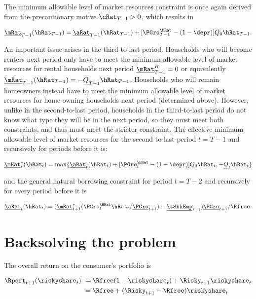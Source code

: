 \documentclass[PortfolioChoiceWithRiskyHousing]{subfiles}
\begin{document}
The minimum allowable level of market resources constraint is once again derived from the precautionary motive $\cRat_{T-1} > 0$, which results in

\begin{equation}
	\underline{\mRat}_{T-1}(\hRat_{T-1}) = \underline{\aRat}_{T-1}( \hRat_{T-1}) + [\PGro^{\HRat}_{T-1} - (1-\depr) ] Q_{0} \hRat_{T-1}.
\end{equation}

An important issue arises in the third-to-last period. Households who will become renters next period only have to meet the minimum allowable level of market resources for rental households next period $\underline{\mRat}^R_{T-1} = 0$ or equivalently $\underline{\mRat}_{T-1}(\hRat_{T-1}) = - \underline{Q}_{T-1} \hRat_{T-1}$. Households who will remain homeowners instead have to meet the minimum allowable level of market resources for home-owning households next period (determined above). However, unlike in the second-to-last period, households in the third-to-last period do not know what type they will be in the next period, so they must meet both constraints, and thus must meet the stricter constraint. The effective minimum allowable level of market resources for the second to-last-period $t=T-1$ and recursively for periods before it is:

\begin{equation}
	\underline{\mRat}_{t}^*(\hRat_{t}) = \max \{ \underline{\aRat}_{t}( \hRat_{t}) + [\PGro^{\HRat}_{t} - (1-\depr) ] Q_{0} \hRat_{t}, - \underline{Q}_{t} \hRat_{t} \}
\end{equation}

and the general natural borrowing constraint for period $t=T-2$ and recursively for every period before it is

\begin{equation}
	\underline{\aRat}_{t}(\hRat_{t}) = (\underline{\mRat}^*_{t+1}(\PGro_{t}^{\HRat} \hRat_{t} / \underline{\PGro}_{t+1}) - \underline{\tShkEmp}_{t+1} ) \underline{\PGro}_{t+1}/ \Rfree.
\end{equation}

\section{Backsolving the problem}

The overall return on the consumer's portfolio is

\begin{equation}
	\begin{split}
		\Rport_{t+1}(\riskyshare_{t}) &~ = \Rfree(1-\riskyshare_{t}) + \Risky_{t+1} \riskyshare_{t} \\
		&~ = \Rfree + (\Risky_{t+1} - \Rfree)\riskyshare_{t}
	\end{split}
\end{equation}
\end{document}
